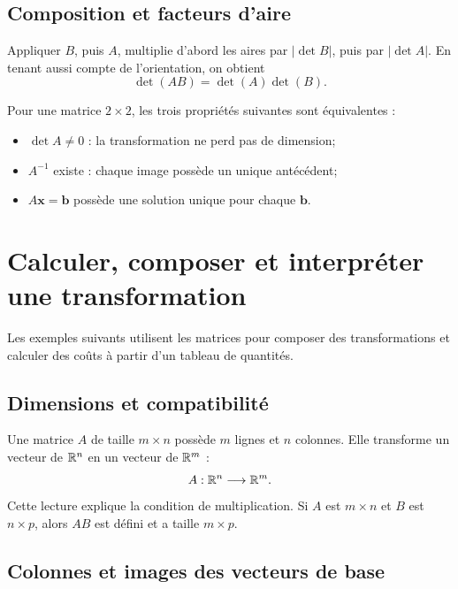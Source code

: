 \subsection{Composition et facteurs d'aire}
Appliquer $B$, puis $A$, multiplie d'abord les aires par $|\det B|$, puis par $|\det A|$. En tenant aussi compte de l'orientation, on obtient
\[
\det(AB)=\det(A)\det(B).
\]

\begin{connectionbox}
Pour une matrice $2\times2$, les trois propriétés suivantes sont équivalentes :
\begin{itemize}
\item $\det A\ne0$ : la transformation ne perd pas de dimension;
\item $A^{-1}$ existe : chaque image possède un unique antécédent;
\item $A\mathbf x=\mathbf b$ possède une solution unique pour chaque $\mathbf b$.
\end{itemize}
\end{connectionbox}


\section{Calculer, composer et interpréter une transformation}
\label{manual:section:11.08}

Les exemples suivants utilisent les matrices pour composer des transformations et calculer des coûts à partir d'un tableau de quantités.

\subsection{Dimensions et compatibilité}

Une matrice $A$ de taille $m\times n$ possède $m$ lignes et $n$ colonnes. Elle transforme un vecteur de $\mathbb{R}^n$ en un vecteur de $\mathbb{R}^m$ :
\[
A:\mathbb{R}^n\longrightarrow\mathbb{R}^m.
\]
Cette lecture explique la condition de multiplication. Si $A$ est $m\times n$ et $B$ est $n\times p$, alors $AB$ est défini et a taille $m\times p$.

\subsection{Colonnes et images des vecteurs de base}


